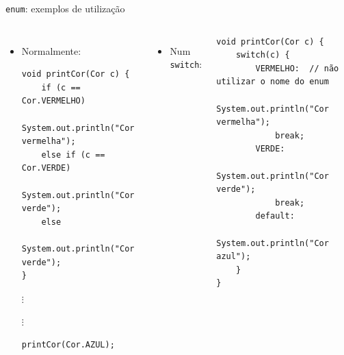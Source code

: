 \documentclass[portuguese, aspectratio=169, xcolor=table]{beamer}
\begin{document}
\begin{frame}[fragile]{\texttt{enum}: exemplos de utilização}
    \scriptsize
\begin{columns}
\begin{itemize}
\item Normalmente:
\begin{verbatim}
void printCor(Cor c) {
    if (c == Cor.VERMELHO)
        System.out.println("Cor vermelha");
    else if (c == Cor.VERDE)
        System.out.println("Cor verde");
    else
        System.out.println("Cor verde");
}
\end{verbatim}
$\vdots$

$\vdots$
\begin{verbatim}
printCor(Cor.AZUL);
\end{verbatim}
\end{itemize}
\begin{itemize}
    \item Num \texttt{switch}:
\end{itemize}
\begin{verbatim}
void printCor(Cor c) {
    switch(c) {
        VERMELHO:  // não utilizar o nome do enum
            System.out.println("Cor vermelha");
            break;
        VERDE:
            System.out.println("Cor verde");
            break;
        default:
            System.out.println("Cor azul");
    }
}
\end{verbatim}
\end{columns}
\end{frame}
\end{document}
